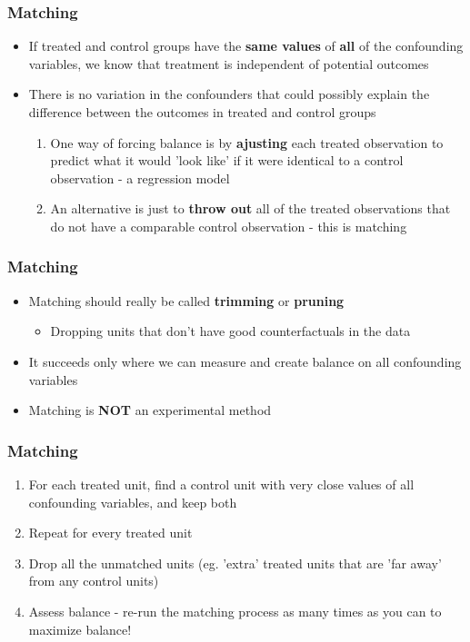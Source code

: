 \documentclass[xcolor=x11names,compress]{beamer}\usepackage[]{graphicx}\usepackage[]{color}
\renewcommand{\(}{\begin{columns}}
\renewcommand{\)}{\end{columns}}
\newcommand{\<}[1]{\begin{column}{#1}}
\renewcommand{\>}{\end{column}}
\begin{document}
\begin{frame}
\frametitle{Matching}
\begin{itemize}
\item If treated and control groups have the \textbf{same values} of \textbf{all} of the confounding variables, we know that treatment is independent of potential outcomes
\pause
\item There is no variation in the confounders that could possibly explain the difference between the outcomes in treated and control groups
\pause
\begin{enumerate}
\item One way of forcing balance is by \textbf{ajusting} each treated observation to predict what it would 'look like' if it were identical to a control observation - a regression model
\pause
\item An alternative is just to \textbf{throw out} all of the treated observations that do not have a comparable control observation - this is matching
\end{enumerate}
\end{itemize}
\end{frame}

\begin{frame}
\frametitle{Matching}
\begin{itemize}
\item Matching should really be called \textbf{trimming} or \textbf{pruning} 
\begin{itemize}
\item Dropping units that don't have good counterfactuals in the data
\end{itemize}
\item It succeeds only where we can measure and create balance on all confounding variables
\pause
\item Matching is \textbf{NOT} an experimental method
\end{itemize}
\end{frame}

\begin{frame}
\frametitle{Matching}
\begin{enumerate}
\item For each treated unit, find a control unit with very close values of all confounding variables, and keep both
\pause
\item Repeat for every treated unit
\pause
\item Drop all the unmatched units (eg. 'extra' treated units that are 'far away' from any control units)
\pause
\item Assess balance - re-run the matching process as many times as you can to maximize balance!
\end{enumerate}
\end{frame}
\end{document}
